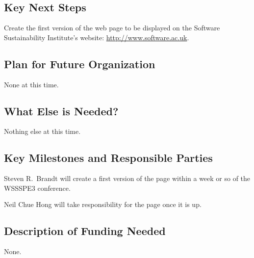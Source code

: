 \subsection{Key Next Steps}

Create the first version of the web page to be displayed on the Software
Sustainability Institute's website: \url{http://www.software.ac.uk}.

\subsection{Plan for Future Organization}

None at this time.

\subsection{What Else is Needed?}

Nothing else at this time.

\subsection{Key Milestones and Responsible Parties}

Steven R.\ Brandt will create a first version of the page within a week or so of
the WSSSPE3 conference.

Neil Chue Hong will take responsibility for the page once it is up.

\subsection{Description of Funding Needed}

None.
